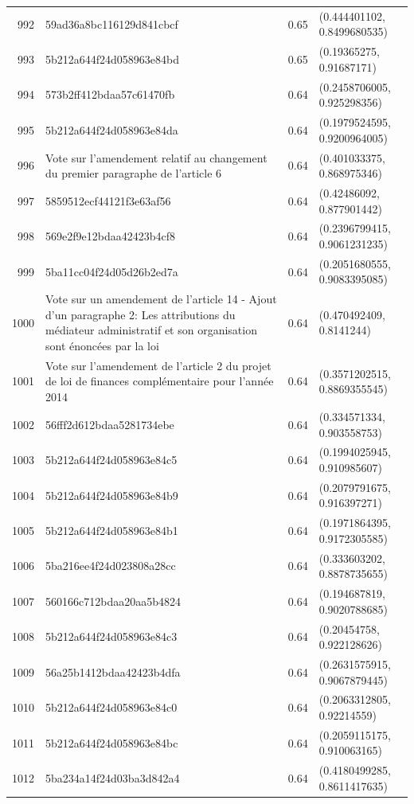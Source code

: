 \begin{table}[ht]
\begin{tabular}{rlrl}
  992 & 59ad36a8bc116129d841cbcf & 0.65 & (0.444401102, 0.8499680535) \\ 
  993 & 5b212a644f24d058963e84bd & 0.65 & (0.19365275, 0.91687171) \\ 
  994 & 573b2ff412bdaa57c61470fb & 0.64 & (0.2458706005, 0.925298356) \\ 
  995 & 5b212a644f24d058963e84da & 0.64 & (0.1979524595, 0.9200964005) \\ 
  996 & Vote sur l'amendement relatif au changement du premier paragraphe de l'article 6 & 0.64 & (0.401033375, 0.868975346) \\ 
  997 & 5859512ecf44121f3e63af56 & 0.64 & (0.42486092, 0.877901442) \\ 
  998 & 569e2f9e12bdaa42423b4cf8 & 0.64 & (0.2396799415, 0.9061231235) \\ 
  999 & 5ba11cc04f24d05d26b2ed7a & 0.64 & (0.2051680555, 0.9083395085) \\ 
  1000 & Vote sur un amendement de l'article 14 - Ajout d'un paragraphe 2: Les attributions du médiateur administratif et son organisation sont énoncées par la loi & 0.64 & (0.470492409, 0.8141244) \\ 
  1001 & Vote sur l'amendement de l'article 2 du projet de loi de finances complémentaire pour l'année 2014 & 0.64 & (0.3571202515, 0.8869355545) \\ 
  1002 & 56fff2d612bdaa5281734ebe & 0.64 & (0.334571334, 0.903558753) \\ 
  1003 & 5b212a644f24d058963e84c5 & 0.64 & (0.1994025945, 0.910985607) \\ 
  1004 & 5b212a644f24d058963e84b9 & 0.64 & (0.2079791675, 0.916397271) \\ 
  1005 & 5b212a644f24d058963e84b1 & 0.64 & (0.1971864395, 0.9172305585) \\ 
  1006 & 5ba216ee4f24d023808a28cc & 0.64 & (0.333603202, 0.8878735655) \\ 
  1007 & 560166c712bdaa20aa5b4824 & 0.64 & (0.194687819, 0.9020788685) \\ 
  1008 & 5b212a644f24d058963e84c3 & 0.64 & (0.20454758, 0.922128626) \\ 
  1009 & 56a25b1412bdaa42423b4dfa & 0.64 & (0.2631575915, 0.9067879445) \\ 
  1010 & 5b212a644f24d058963e84c0 & 0.64 & (0.2063312805, 0.92214559) \\ 
  1011 & 5b212a644f24d058963e84bc & 0.64 & (0.2059115175, 0.910063165) \\ 
  1012 & 5ba234a14f24d03ba3d842a4 & 0.64 & (0.4180499285, 0.8611417635) \\ 

\end{tabular}
\end{table}

